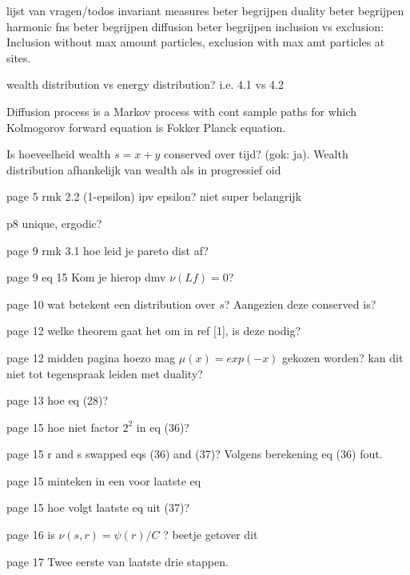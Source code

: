 lijst van vragen/todos
invariant measures beter begrijpen
duality beter begrijpen
harmonic fns beter begrijpen
diffusion beter begrijpen
inclusion vs exclusion: Inclusion without max amount particles, exclusion with max amt particles at sites.

wealth distribution vs energy distribution? i.e. 4.1 vs 4.2


Diffusion process is a Markov process with cont sample paths for which Kolmogorov forward equation is Fokker Planck equation.


Is hoeveelheid wealth $s=x+y$ conserved over tijd? (gok: ja). Wealth distribution afhankelijk van wealth als in progressief oid

page 5 rmk 2.2 (1-epsilon) ipv epsilon? niet super belangrijk

p8 unique, ergodic?

page 9 rmk 3.1 hoe leid je pareto dist af?

page 9 eq 15
Kom je hierop dmv $\nu(Lf) = 0$?

page 10
wat betekent een distribution over $s$? Aangezien deze conserved is?

page 12 welke theorem gaat het om in ref [1], is deze nodig?


page 12 midden pagina hoezo mag $\mu(x) = exp(-x)$ gekozen worden? kan dit niet tot tegenspraak leiden met duality?


page 13 hoe eq (28)?

page 15 hoe niet factor $2^2$ in eq (36)?

page 15 r and s swapped eqs (36) and (37)? Volgens berekening eq (36) fout.

page 15 minteken in een voor laatste eq

page 15 hoe volgt laatste eq uit (37)?

page 16 is $\nu(s, r) = \psi(r)/C$ ? beetje getover dit


page 17 Twee eerste van laatste drie stappen.